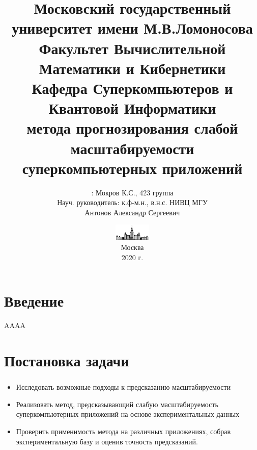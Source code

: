 \documentclass[unicode, t]{beamer}%
\title{
	{\footnotesize\color{black}Московский государственный университет имени М.В.Ломоносова\\
    Факультет Вычислительной Математики и Кибернетики\\
    Кафедра Суперкомпьютеров и Квантовой Информатики\\}
    \vspace{\baselineskip}
    {\LARGEРазработка метода прогнозирования слабой масштабируемости суперкомпьютерных приложений}
}
\author{\footnotesizeСтудент: Мокров К.С., 423 группа\\
		Науч. руководитель: к.ф-м.н.,
		в.н.с. НИВЦ МГУ\\
		Антонов Александр Сергеевич}
\date{\includegraphics[height=0.8cm]{./images/MSU}\\
	  \scriptsize
	  Москва\\
	  2020 г.}
\begin{document}
	\frame[plain]{\titlepage}	%

	\section{Введение}
		\begin{frame}
		AAAA
		\end{frame}

	\section{Постановка задачи}
		\begin{frame}
			\frametitle{\insertsection}
			\begin{itemize}[label=\(\bullet\)]
				\item Исследовать возможные подходы к предсказанию масштабируемости
				\item Реализовать метод, предсказывающий слабую масштабируемость суперкомпьютерных приложений на основе экспериментальных данных
				\item Проверить применимость метода на различных приложениях, собрав экспериментальную базу и оценив точность предсказаний.
			\end{itemize}
		\end{frame}
\end{document}
